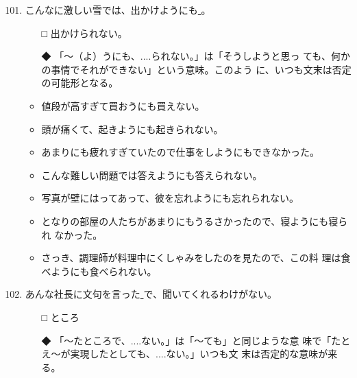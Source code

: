 \documentclass[
uplatex,
b5paper,
10pt,
dvipdfmx
]{jsbook}
\begin{document}
\begin{enumerate}
\setcounter{enumi}{100}

\item こんなに激しい雪では、出かけようにも\underline{   }。

\begin{itemize}
\item[□] 出かけられない。
\item[◆] 「〜（よ）うにも、....られない。」は「そうしようと思っ
	  ても、何かの事情でそれができない」という意味。このよう
	  に、いつも文末は否定の可能形となる。
\end{itemize}

\begin{itemize}
\item 値段が高すぎて買おうにも買えない。
\item 頭が痛くて、起きようにも起きられない。
\item あまりにも疲れすぎていたので仕事をしようにもできなかった。
\item こんな難しい問題では答えようにも答えられない。
\item 写真が壁にはってあって、彼を忘れようにも忘れられない。  
\item となりの部屋の人たちがあまりにもうるさかったので、寝ようにも寝られ
      なかった。
\item さっき、調理師が料理中にくしゃみをしたのを見たので、この料
      理は食べようにも食べられない。
\end{itemize}

\item あんな社長に文句を言った\underline{   }で、聞いてくれるわけがない。
\begin{itemize}
\item[□] ところ
\item[◆] 「〜たところで、....ない。」は「〜ても」と同じような意
	  味で「たとえ〜が実現したとしても、....ない。」いつも文
	  末は否定的な意味が来る。
\end{itemize}


\end{enumerate}
\end{document}
